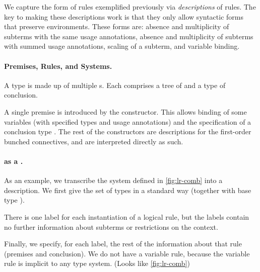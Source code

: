 We capture the form of rules exemplified previously via
\emph{descriptions} of rules.
The key to making these descriptions work is that they only allow syntactic
forms that preserve environments.
These forms are: absence and multiplicity of subterms with the same usage
annotations, absence and multiplicity of subterms with summed usage annotations,
scaling of a subterm, and variable binding.

\paragraph{Premises, Rules, and Systems.}

A type  is made up of multiple s.
Each  comprises a tree of  and a type
of conclusion.

A single premise is introduced by the
 constructor.
This allows binding of some variables \AgdaBound{$\Delta$} (with specified
types and usage annotations) and the specification of a conclusion type
.
The rest of the constructors are descriptions for the first-order bunched
connectives, and are interpreted directly as such.


\paragraph{ as a .}

As an example, we transcribe the system defined in \cref{fig:lr-comb} into a
description.
We first give the set of types in a standard way (together with base type
\AgdaInductiveConstructor{$\iota$}).


There is one label for each instantiation of a logical rule, but the labels
contain no further information about subterms or restrictions on the context.


Finally, we specify, for each label, the rest of the information about that
rule {\color{red}(premises and conclusion)}.
We do not have a variable rule, because the variable rule is implicit to any
type system.
{\color{red}(Looks like \cref{fig:lr-comb})}

